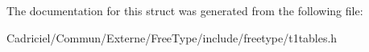 The documentation for this struct was generated from the following file\-:\begin{DoxyCompactItemize}
\item 
Cadriciel/\-Commun/\-Externe/\-Free\-Type/include/freetype/t1tables.\-h\end{DoxyCompactItemize}
